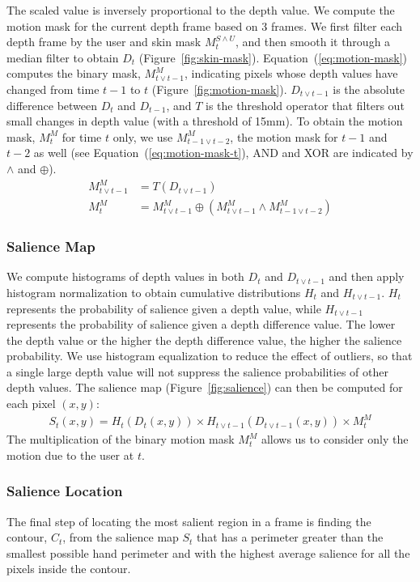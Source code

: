 The scaled value is inversely proportional to the depth value.
We compute the motion mask for the current depth frame based on 3 frames. We first filter each
depth frame by the user and skin mask $M_t^{S\wedge U}$, and then
smooth it through a median filter to obtain $D_t$ (Figure~\ref{fig:skin-mask}).
Equation~(\ref{eq:motion-mask}) computes the binary mask, $M_{t\vee t-1}^M$,
indicating pixels whose depth values have changed from time $t-1$ to $t$ (Figure~\ref{fig:motion-mask}).
$D_{t\vee t-1}$ is the absolute difference between $D_t$ and $D_{t-1}$, and $T$ is the threshold operator that filters out small changes in depth value
(with a threshold of 15mm).
To obtain the motion mask, $M_{t}^M$ for time $t$ only, we use $M_{t-1\vee t-2}^M$, the motion mask for $t-1$ and $t-2$ as well (see Equation~(\ref{eq:motion-mask-t}),
 AND and XOR are indicated by $\wedge$ and $\oplus$).
\begin{align}
M_{t\vee t-1}^M &= T(D_{t\vee t-1}) \label{eq:motion-mask} \\
M_{t}^M &= M_{t\vee t-1}^M \oplus (M_{t\vee t-1}^M \wedge M_{t-1\vee t-2}^M) \label{eq:motion-mask-t}
\end{align}

\subsubsection{Salience Map}
We compute histograms of depth values in both $D_t$ and $D_{t\vee t-1}$ and then apply histogram normalization to obtain cumulative distributions $H_t$ and $H_{t\vee t-1}$.
$H_t$ represents the probability of salience given a depth value, while $H_{t\vee t-1}$ represents the probability of salience given
a depth difference value. The lower the depth value or the higher the depth difference value, the higher the salience probability. We use
histogram equalization to reduce the effect of outliers, so that a single large depth value will not suppress the salience probabilities of other depth values.
The salience map (Figure~\ref{fig:salience}) can then be computed for each pixel $(x, y)$:
\begin{align*}
S_t(x, y) = H_t(D_t(x, y)) \times H_{t\vee t-1}(D_{t\vee t-1}(x, y)) \times M_t^M
\end{align*}
The multiplication of the binary motion mask $M_t^M$ allows us to consider only the motion due to the user at $t$.

\subsubsection{Salience Location}
The final step of locating the most salient region in a frame is finding the
contour, $C_t$, from the salience map $S_t$ that has a perimeter greater than
the smallest possible hand perimeter and with the highest average salience for all the pixels inside the contour.


